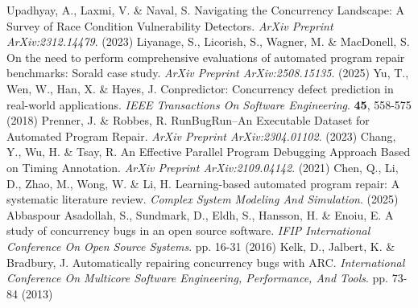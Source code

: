 \begin{thebibliography}{20}
Upadhyay, A., Laxmi, V. \& Naval, S. Navigating the Concurrency Landscape: A Survey of Race Condition Vulnerability Detectors. {\em ArXiv Preprint ArXiv:2312.14479}. (2023)
Liyanage, S., Licorish, S., Wagner, M. \& MacDonell, S. On the need to perform comprehensive evaluations of automated program repair benchmarks: Sorald case study. {\em ArXiv Preprint ArXiv:2508.15135}. (2025)
Yu, T., Wen, W., Han, X. \& Hayes, J. Conpredictor: Concurrency defect prediction in real-world applications. {\em IEEE Transactions On Software Engineering}. \textbf{45}, 558-575 (2018)
Prenner, J. \& Robbes, R. RunBugRun–An Executable Dataset for Automated Program Repair. {\em ArXiv Preprint ArXiv:2304.01102}. (2023)
Chang, Y., Wu, H. \& Tsay, R. An Effective Parallel Program Debugging Approach Based on Timing Annotation. {\em ArXiv Preprint ArXiv:2109.04142}. (2021)
Chen, Q., Li, D., Zhao, M., Wong, W. \& Li, H. Learning-based automated program repair: A systematic literature review. {\em Complex System Modeling And Simulation}. (2025)
Abbaspour Asadollah, S., Sundmark, D., Eldh, S., Hansson, H. \& Enoiu, E. A study of concurrency bugs in an open source software. {\em IFIP International Conference On Open Source Systems}. pp. 16-31 (2016)
Kelk, D., Jalbert, K. \& Bradbury, J. Automatically repairing concurrency bugs with ARC. {\em International Conference On Multicore Software Engineering, Performance, And Tools}. pp. 73-84 (2013)

\end{thebibliography}